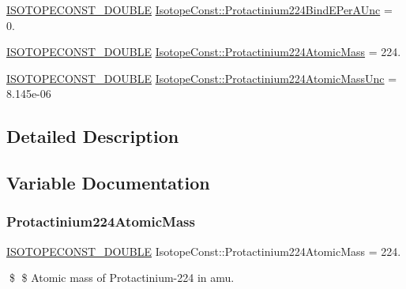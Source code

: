\begin{DoxyCompactItemize}
\item 
\mbox{\hyperlink{group___isotope_const-_macros_ga8f45a7272ce02c0b4c65c44636ed719a}{I\+S\+O\+T\+O\+P\+E\+C\+O\+N\+S\+T\+\_\+\+D\+O\+U\+B\+LE}} \mbox{\hyperlink{group___isotope_const-_protactinium-_pa224_ga06991970dc4fa0eef825dc75346f8eb4}{Isotope\+Const\+::\+Protactinium224\+Bind\+E\+Per\+A\+Unc}} = 0.
\item 
\mbox{\hyperlink{group___isotope_const-_macros_ga8f45a7272ce02c0b4c65c44636ed719a}{I\+S\+O\+T\+O\+P\+E\+C\+O\+N\+S\+T\+\_\+\+D\+O\+U\+B\+LE}} \mbox{\hyperlink{group___isotope_const-_protactinium-_pa224_gad2e89773672c08ac5ff2294cf5c3b05b}{Isotope\+Const\+::\+Protactinium224\+Atomic\+Mass}} = 224.
\item 
\mbox{\hyperlink{group___isotope_const-_macros_ga8f45a7272ce02c0b4c65c44636ed719a}{I\+S\+O\+T\+O\+P\+E\+C\+O\+N\+S\+T\+\_\+\+D\+O\+U\+B\+LE}} \mbox{\hyperlink{group___isotope_const-_protactinium-_pa224_ga8ef34b8adc26284077cd7023ad1e6fe6}{Isotope\+Const\+::\+Protactinium224\+Atomic\+Mass\+Unc}} = 8.\+145e-\/06
\end{DoxyCompactItemize}


\subsection{Detailed Description}


\subsection{Variable Documentation}
\mbox{\label{group___isotope_const-_protactinium-_pa224_gad2e89773672c08ac5ff2294cf5c3b05b}} 
\subsubsection{\texorpdfstring{Protactinium224\+Atomic\+Mass}{Protactinium224AtomicMass}}
{\footnotesize\ttfamily \mbox{\hyperlink{group___isotope_const-_macros_ga8f45a7272ce02c0b4c65c44636ed719a}{I\+S\+O\+T\+O\+P\+E\+C\+O\+N\+S\+T\+\_\+\+D\+O\+U\+B\+LE}} Isotope\+Const\+::\+Protactinium224\+Atomic\+Mass = 224.}

\$ \$ Atomic mass of Protactinium-\/224 in amu. \mbox{\label{group___isotope_const-_protactinium-_pa224_ga8ef34b8adc26284077cd7023ad1e6fe6}} 
